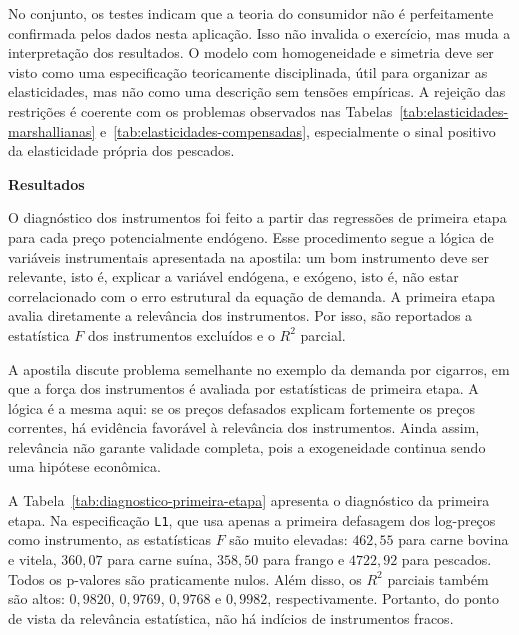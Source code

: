 No conjunto, os testes indicam que a teoria do consumidor não é perfeitamente confirmada pelos dados nesta aplicação. Isso não invalida o exercício, mas muda a interpretação dos resultados. O modelo com homogeneidade e simetria deve ser visto como uma especificação teoricamente disciplinada, útil para organizar as elasticidades, mas não como uma descrição sem tensões empíricas. A rejeição das restrições é coerente com os problemas observados nas Tabelas~\ref{tab:elasticidades-marshallianas} e~\ref{tab:elasticidades-compensadas}, especialmente o sinal positivo da elasticidade própria dos pescados.



\textbf{Resultados}

O diagnóstico dos instrumentos foi feito a partir das regressões de primeira etapa para cada preço potencialmente endógeno. Esse procedimento segue a lógica de variáveis instrumentais apresentada na apostila: um bom instrumento deve ser relevante, isto é, explicar a variável endógena, e exógeno, isto é, não estar correlacionado com o erro estrutural da equação de demanda. A primeira etapa avalia diretamente a relevância dos instrumentos. Por isso, são reportados a estatística \(F\) dos instrumentos excluídos e o \(R^2\) parcial.

A apostila discute problema semelhante no exemplo da demanda por cigarros, em que a força dos instrumentos é avaliada por estatísticas de primeira etapa. A lógica é a mesma aqui: se os preços defasados explicam fortemente os preços correntes, há evidência favorável à relevância dos instrumentos. Ainda assim, relevância não garante validade completa, pois a exogeneidade continua sendo uma hipótese econômica.



A Tabela~\ref{tab:diagnostico-primeira-etapa} apresenta o diagnóstico da primeira etapa. Na especificação \texttt{L1}, que usa apenas a primeira defasagem dos log-preços como instrumento, as estatísticas \(F\) são muito elevadas: \(462{,}55\) para carne bovina e vitela, \(360{,}07\) para carne suína, \(358{,}50\) para frango e \(4722{,}92\) para pescados. Todos os p-valores são praticamente nulos. Além disso, os \(R^2\) parciais também são altos: \(0{,}9820\), \(0{,}9769\), \(0{,}9768\) e \(0{,}9982\), respectivamente. Portanto, do ponto de vista da relevância estatística, não há indícios de instrumentos fracos.

